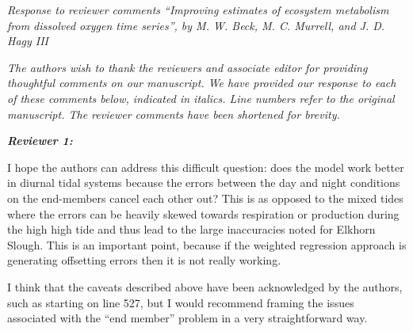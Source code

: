 \documentclass[letterpaper,12pt]{article}\usepackage[]{graphicx}\usepackage[]{color}
\newcommand{\Bigtxt}[1]{\textbf{\textit{#1}}}
\begin{document}
\raggedright


{\it Response to reviewer comments ``Improving estimates of ecosystem metabolism from dissolved oxygen time series'', by M. W. Beck, M. C. Murrell, and J. D. Hagy III}

{\it The authors wish to thank the reviewers and associate editor for providing thoughtful comments on our manuscript.  We have provided our response to each of these comments below, indicated in italics.  Line numbers refer to the original manuscript. The reviewer comments have been shortened for brevity.}

\Bigtxt{Reviewer 1:}

I hope the authors can address this difficult question: does the model work better in diurnal tidal systems because the errors between the day and night conditions on the end-members cancel each other out? This is as opposed to the mixed tides where the errors can be heavily skewed towards respiration or production during the high high tide and thus lead to the large inaccuracies noted for Elkhorn Slough. This is an important point, because if the weighted regression approach is generating offsetting errors then it is not really working.

I think that the caveats described above have been acknowledged by the authors, such as starting on line 527, but I would recommend framing the issues associated with the “end member” problem in a very straightforward way. 
\end{document}
